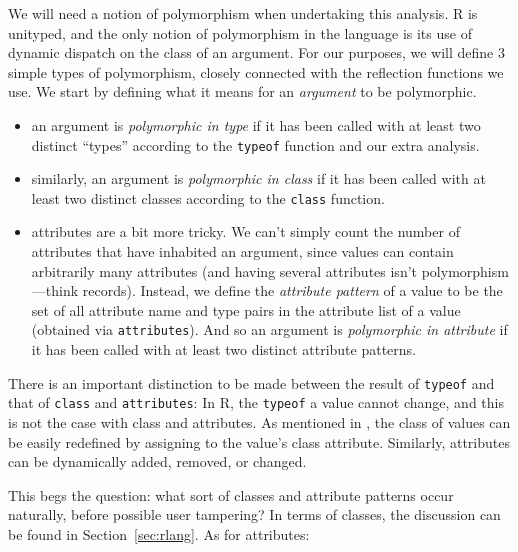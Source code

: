 \documentclass[acmsmall,10pt,review,anonymous]{acmart}\settopmatter{printfolios=true,printccs=false,printacmref=false}
\newcommand{\code}[1]{\lstinline|#1|\xspace}
\begin{document}
We will need a notion of polymorphism when undertaking this analysis. R
is unityped, and the only notion of polymorphism in the language is its use
of dynamic dispatch on the class of an argument.  For our purposes, we will
define 3 simple types of polymorphism, closely connected with the reflection
functions we use.  We start by defining what it means for an {\it argument}
to be polymorphic.  

\begin{itemize}
\item an argument is {\it polymorphic in type} if it has been called with at
  least two distinct ``types'' according to the \code{typeof} function and
  our extra analysis.
\item similarly, an argument is {\it polymorphic in class} if it has been
  called with at least two distinct classes according to the \code{class}
  function.
	
\item attributes are a bit more tricky.  We can't simply count the number of
  attributes that have inhabited an argument, since values can contain
  arbitrarily many attributes (and having several attributes isn't
  polymorphism---think records).  Instead, we define the {\it attribute
    pattern} of a value to be the set of all attribute name and type pairs
  in the attribute list of a value (obtained via \code{attributes}).  And so
  an argument is {\it polymorphic in attribute} if it has been called with
  at least two distinct attribute patterns.

\end{itemize}

There is an important distinction to be made between the result of
\code{typeof} and that of \code{class} and \code{attributes}: In R, the
\code{typeof} a value cannot change, and this is not the case with class and
attributes.  As mentioned in , the class of values
can be easily redefined by assigning to the value's class attribute.
Similarly, attributes can be dynamically added, removed, or changed.

This begs the question: what sort of classes and attribute patterns occur
naturally, before possible user tampering?  In terms of classes, the
discussion can be found in Section~\ref{sec:rlang}.  As for attributes:
\end{document}
